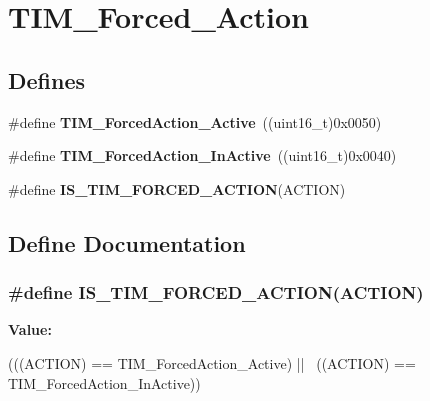 \hypertarget{group__TIM__Forced__Action}{
\section{TIM\_\-Forced\_\-Action}
\label{group__TIM__Forced__Action}
}
\subsection*{Defines}
\begin{DoxyCompactItemize}
\item 
\hypertarget{group__TIM__Forced__Action_ga19d3769825f1dfdbdbde3edb60310b99}{
\#define {\bfseries TIM\_\-ForcedAction\_\-Active}~((uint16\_\-t)0x0050)}
\label{group__TIM__Forced__Action_ga19d3769825f1dfdbdbde3edb60310b99}

\item 
\hypertarget{group__TIM__Forced__Action_ga79656f2193ec5e12a15d0ae5b025d273}{
\#define {\bfseries TIM\_\-ForcedAction\_\-InActive}~((uint16\_\-t)0x0040)}
\label{group__TIM__Forced__Action_ga79656f2193ec5e12a15d0ae5b025d273}

\item 
\#define {\bfseries IS\_\-TIM\_\-FORCED\_\-ACTION}(ACTION)
\end{DoxyCompactItemize}


\subsection{Define Documentation}
\hypertarget{group__TIM__Forced__Action_gaa2cb16f281d32c95ab974dc5157bfa63}{
\subsubsection[{IS\_\-TIM\_\-FORCED\_\-ACTION}]{\setlength{\rightskip}{0pt plus 5cm}\#define IS\_\-TIM\_\-FORCED\_\-ACTION(ACTION)}}
\label{group__TIM__Forced__Action_gaa2cb16f281d32c95ab974dc5157bfa63}
{\bfseries Value:}
\begin{DoxyCode}
(((ACTION) == TIM_ForcedAction_Active) || \
                                      ((ACTION) == TIM_ForcedAction_InActive))
\end{DoxyCode}
